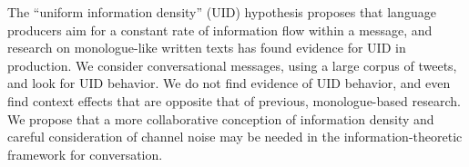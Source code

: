 The ``uniform information density'' (UID) hypothesis proposes that language producers aim for a constant rate of information flow within a message, and research on monologue-like written texts has found evidence for UID in production.  We consider conversational messages, using a large corpus of tweets, and look for UID behavior.  We do not find evidence of UID behavior, and even find context effects that are opposite that of previous, monologue-based research.  We propose that a more collaborative conception of information density and careful consideration of channel noise may be needed in the information-theoretic framework for conversation.

